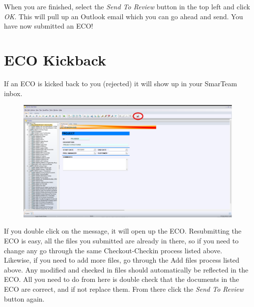 \documentclass[10pt]{article}
\begin{document}
                When you are finished, select the \emph{Send To Review} button in the top left and click \emph{OK}. This will pull up an Outlook email which you can go ahead and send. You have now submitted an ECO!
    \section{ECO Kickback}
        If an ECO is kicked back to you (rejected) it will show up in your SmarTeam inbox.
        \begin{figure}[H]
            \centerline{\includegraphics[width=\textwidth]{References/ST Inbox.png}}
        \end{figure}
        If you double click on the message, it will open up the ECO. Resubmitting the ECO is easy, all the files you submitted are already in there, so if you need to change any go through the same Checkout-Checkin process listed above. Likewise, if you need to add more files, go through the Add files process listed above. Any modified and checked in files should automatically be reflected in the ECO. All you need to do from here is double check that the documents in the ECO are correct, and if not replace them. From there click the \emph{Send To Review} button again.
\end{document}
